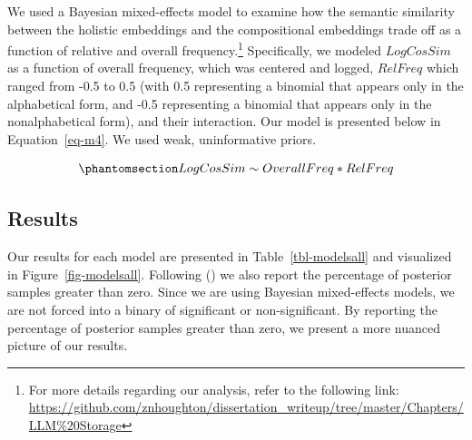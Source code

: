 \documentclass[
  12pt,
  letterpaper,
]{scrreport}
\begin{document}
We used a Bayesian mixed-effects model to examine how the semantic
similarity between the holistic embeddings and the compositional
embeddings trade off as a function of relative and overall
frequency.\footnote{For more details regarding our analysis, refer to
  the following link:
  \url{https://github.com/znhoughton/dissertation_writeup/tree/master/Chapters/LLM\%20Storage}}
Specifically, we modeled \(LogCosSim\) as a function of overall
frequency, which was centered and logged, \(RelFreq\) which ranged from
-0.5 to 0.5 (with 0.5 representing a binomial that appears only in the
alphabetical form, and -0.5 representing a binomial that appears only in
the nonalphabetical form), and their interaction. Our model is presented
below in Equation~\ref{eq-m4}. We used weak, uninformative priors.

\begin{equation}\phantomsection\label{eq-m4}{
LogCosSim \sim OverallFreq*RelFreq
}\end{equation}

\subsection{Results}\label{results-8}

Our results for each model are presented in Table~\ref{tbl-modelsall}
and visualized in Figure~\ref{fig-modelsall}. Following
() we also report the percentage of posterior samples
greater than zero. Since we are using Bayesian mixed-effects models, we
are not forced into a binary of significant or non-significant. By
reporting the percentage of posterior samples greater than zero, we
present a more nuanced picture of our results.
\end{document}
